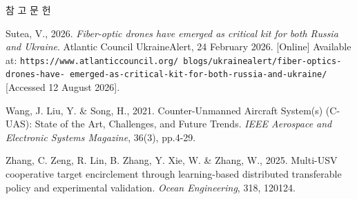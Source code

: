 \documentclass[10pt,twocolumn]{extarticle}
\newenvironment{snakreferences}
  {\par{\centering\fontsize{15}{22.5}\selectfont 참 고 문 헌\par}\vspace{6pt}%
   \fontsize{9.5}{14.25}\selectfont
   \setlength{\parindent}{-7.1mm}\setlength{\leftskip}{7.1mm}}
  {\par}
\begin{document}
\begin{snakreferences}
Sutea, V., 2026. \textit{Fiber-optic drones have emerged as critical kit for
both Russia and Ukraine}. Atlantic Council UkraineAlert, 24 February 2026.
[Online] Available at: \texttt{https://www.atlanticcouncil.org/\allowbreak
blogs/ukrainealert/\allowbreak fiber-optics-drones-have-\allowbreak
emerged-as-critical-kit-\allowbreak for-both-russia-and-ukraine/}
[Accessed 12 August 2026].

Wang, J. Liu, Y. \& Song, H., 2021. Counter-Unmanned Aircraft System(s) (C-UAS):
State of the Art, Challenges, and Future Trends. \textit{IEEE Aerospace and
Electronic Systems Magazine}, 36(3), pp.4-29.

Zhang, C. Zeng, R. Lin, B. Zhang, Y. Xie, W. \& Zhang, W., 2025. Multi-USV
cooperative target encirclement through learning-based distributed transferable
policy and experimental validation. \textit{Ocean Engineering}, 318, 120124.

\end{snakreferences}
\end{document}
